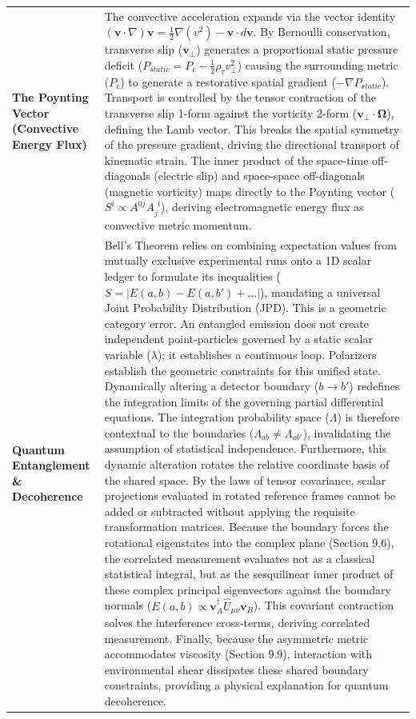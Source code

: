 \begin{longtable}{p{} p{}}
    \textbf{The Poynting Vector (Convective Energy Flux)} & The convective acceleration expands via the vector identity $(\mathbf{v} \cdot \nabla)\mathbf{v} = \frac{1}{2}\nabla(v^2) - \mathbf{v} \cdot d\mathbf{v}$. By Bernoulli conservation, transverse slip ($\mathbf{v}_\perp$) generates a proportional static pressure deficit ($P_{static} = P_c - \frac{1}{2}\rho_\tau v_\perp^2$) causing the surrounding metric ($P_c$) to generate a restorative spatial gradient ($-\nabla P_{static}$). Transport is controlled by the tensor contraction of the transverse slip 1-form against the vorticity 2-form ($\mathbf{v}_\perp \cdot \boldsymbol{\Omega}$), defining the Lamb vector. This breaks the spatial symmetry of the pressure gradient, driving the directional transport of kinematic strain. The inner product of the space-time off-diagonals (electric slip) and space-space off-diagonals (magnetic vorticity) maps directly to the Poynting vector ($S^i \propto A^{0j}A_j^{\phantom{j}i}$), deriving electromagnetic energy flux as convective metric momentum. \\ 
    \textbf{Quantum Entanglement \& Decoherence} & Bell's Theorem relies on combining expectation values from mutually exclusive experimental runs onto a 1D scalar ledger to formulate its inequalities ($S = |E(a,b) - E(a,b') + \dots|$), mandating a universal Joint Probability Distribution (JPD). This is a geometric category error. An entangled emission does not create independent point-particles governed by a static scalar variable ($\lambda$); it establishes a continuous loop. Polarizers establish the geometric constraints for this unified state. Dynamically altering a detector boundary ($b \to b'$) redefines the integration limits of the governing partial differential equations. The integration probability space ($\Lambda$) is therefore contextual to the boundaries ($\Lambda_{ab} \neq \Lambda_{ab'}$), invalidating the assumption of statistical independence. Furthermore, this dynamic alteration rotates the relative coordinate basis of the shared space. By the laws of tensor covariance, scalar projections evaluated in rotated reference frames cannot be added or subtracted without applying the requisite transformation matrices. Because the boundary forces the rotational eigenstates into the complex plane (Section 9.6), the correlated measurement evaluates not as a classical statistical integral, but as the sesquilinear inner product of these complex principal eigenvectors against the boundary normals ($E(a,b) \propto \mathbf{v}_A^\dagger \hat{U}_{\mu\nu} \mathbf{v}_B$). This covariant contraction solves the interference cross-terms, deriving correlated measurement. Finally, because the asymmetric metric accommodates viscosity (Section 9.9), interaction with environmental shear dissipates these shared boundary constraints, providing a physical explanation for quantum decoherence. \\

\end{longtable}
